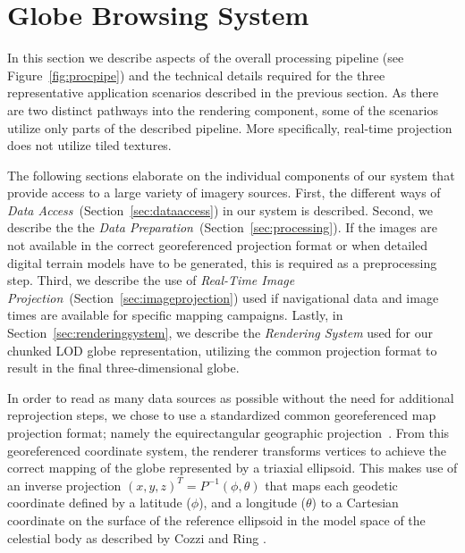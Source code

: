 \documentclass[journal]{vgtc}                %
\newcommand{\fig}[1]{Figure~\ref{fig:#1}}
\begin{document}

\section{Globe Browsing System} \label{sec:overview}
In this section we describe aspects of the overall processing pipeline (see \fig{procpipe}) and the technical details required for the three representative application scenarios described in the previous section.
As there are two distinct pathways into the rendering component, some of the scenarios utilize only parts of the described pipeline. More specifically, real-time projection does not utilize tiled textures.

The following sections elaborate on the individual components of our system that provide access to a large variety of imagery sources.
First, the different ways of \emph{Data Access}~(Section~\ref{sec:dataaccess}) in our system is described.
Second, we describe the the \emph{Data Preparation}~(Section~\ref{sec:processing}). If the images are not available in the correct georeferenced projection format or when detailed digital terrain models have to be generated, this is required as a preprocessing step.
Third, we describe the use of \emph{Real-Time Image Projection}~(Section~\ref{sec:imageprojection}) used if navigational data and image times are available for specific mapping campaigns.
Lastly, in Section~\ref{sec:renderingsystem}, we describe the \emph{Rendering System} used for our chunked LOD globe representation, utilizing the common projection format to result in the final three-dimensional globe.

In order to read as many data sources as possible without the need for additional reprojection steps, we chose to use a standardized common georeferenced map projection format; namely the equirectangular geographic projection~\cite{snyder1997flattening}.
From this georeferenced coordinate system, the renderer transforms vertices to achieve the correct mapping of the globe represented by a triaxial ellipsoid.
This makes use of an inverse projection $(x,y,z)^T = P^{-1}(\phi, \theta)$ that maps each geodetic coordinate defined by a latitude ($\phi$), and a longitude ($\theta$) to a Cartesian coordinate on the surface of the reference ellipsoid in the model space of the celestial body as described by Cozzi and Ring \cite{cozzi20113d}.
\end{document}

